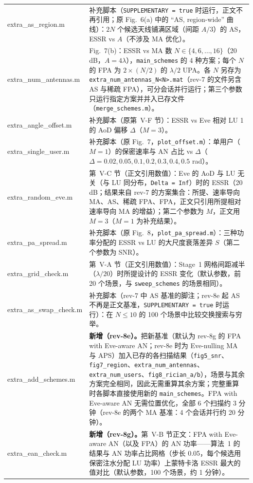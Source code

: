\documentclass[11pt,a4paper]{ctexart}
\newcommand{\code}[1]{\texttt{#1}}
\begin{document}
\begin{longtable}{>{\ttfamily\small}p{4.6cm}p{11.2cm}}
extra\_as\_region.m & 补充脚本（\code{SUPPLEMENTARY = true} 时运行，正文不再引用；原 Fig.~6(a) 中的 “AS, region-wide” 曲线）：$2N$ 个候选天线铺满区域（间距 $A/3$）的 AS，ESSR vs $A$（不涉及 MA 优化）。\\
extra\_num\_antennas.m & Fig.~7(b)：ESSR vs MA 数 $N\in\{4,6,\ldots,16\}$（20 dB，$A=4\lambda$），\code{main\_schemes} 的 4 种方案；每个 $N$ 的 FPA 为 $2\times(N/2)$ 的 $\lambda/2$ UPA。各 $N$ 另存为 \code{extra\_num\_antennas\_N<N>.mat}（rev-7 的文件另含 AS 与稀疏 FPA），可分会话并行运行；第三个参数只运行指定方案并并入已存文件（\code{merge\_schemes.m}）。\\
extra\_angle\_offset.m & 补充脚本（原第~V-F 节）：ESSR vs Eve 相对 LU 1 的 AoD 偏移 $\Delta$（$M=3$）。\\
extra\_single\_user.m & 补充脚本（原 Fig.~7，\code{plot\_offset.m}）：单用户（$M=1$）的保密速率与 AN 占比 vs $\Delta$（$\Delta=0.02,0.05,0.1,0.2,0.3,0.4,0.5$ rad）。\\
extra\_random\_eve.m & 第~V-C 节（正文引用数值）：Eve 的 AoD 与 LU 无关（与 LU 同分布，\code{Delta = Inf}）时的 ESSR（20 dB；结果来自 rev-7 的方案集合：所提、速率导向 MA、AS、稀疏 FPA、FPA，正文只引用所提相对速率导向 MA 的增益）；第二个参数为 $M$，正文用 $M=3$（$M=1$ 为补充结果）。\\
extra\_pa\_spread.m & 补充脚本（原 Fig.~8，\code{plot\_pa\_spread.m}）：三种功率分配的 ESSR vs LU 的大尺度衰落差异 $S$（第二个参数为 SNR）。\\
extra\_grid\_check.m & 第~V-A 节（正文引用数值）：Stage~1 网格间距减半（$\lambda/20$）时所提设计的 ESSR 变化（默认参数，前 20 个场景，与 \code{sweep\_schemes} 的场景相同）。\\
extra\_as\_swap\_check.m & 补充脚本（rev-7 中 AS 基准的脚注；rev-8e 起 AS 不再是正文基准，\code{SUPPLEMENTARY = true} 时运行）：在 $N\le10$ 的 100 个场景中比较交换搜索与穷举。\\
extra\_add\_schemes.m & \textbf{新增（rev-8e）。}把新基准（默认为 rev-8g 的 FPA with Eve-aware AN；rev-8e 时为 Eve-nulling MA 与 APS）加入已存的各扫描结果（\code{fig5\_snr}、\code{fig7\_region}、\code{extra\_num\_antennas}、\code{extra\_num\_users}、\code{fig8\_rician\_a/b}），场景与其余方案完全相同，因此无需重算其余方案；完整重算时各脚本直接使用新的 \code{main\_schemes}。FPA with Eve-aware AN 无需位置优化，全部 6 个扫描约 3 分钟（rev-8e 的两个 MA 基准：4 个会话并行约 20 分钟）。\\
extra\_ean\_check.m & \textbf{新增（rev-8g）。}第~V-B 节正文：FPA with Eve-aware AN（以及 FPA）的 AN 功率——算法~1 的结果与 AN 功率占比网格（步长 0.05，每个候选用保密注水分配 LU 功率）上蒙特卡洛 ESSR 最大的值对比（默认参数，100 个场景，约 1 分钟）。\\

\end{longtable}
\end{document}
